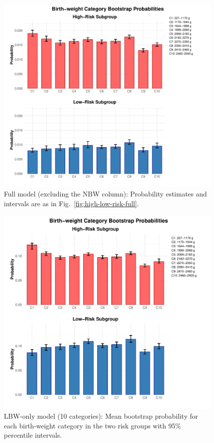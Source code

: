 \begin{figure}[H]
  \centering
  \includegraphics[width=\textwidth]{chapters/chapter3/figures/high_low_risk_full_without_NBW.pdf}
  \caption{Full model (excluding the NBW column): Probability estimates and intervals are as in Fig.~\ref{fig:high-low-risk-full}.}
  \label{fig:high-low-risk-full-w/o-NBW}
\end{figure}

\begin{figure}[H]
  \centering
  \includegraphics[width=\textwidth]{chapters/chapter3/figures/high_low_risk_small.pdf}
  \caption{LBW-only model (10 categories):  Mean bootstrap probability for each birth-weight category in the two risk groups with 95\% percentile intervals.}
  \label{fig:high-low-risk-lbw}
\end{figure}

